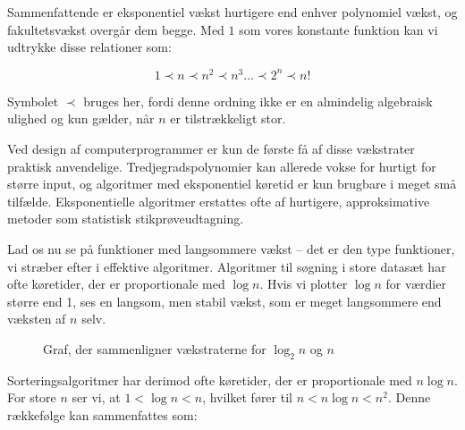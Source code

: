 Sammenfattende er eksponentiel vækst hurtigere end enhver polynomiel vækst, og fakultetsvækst overgår dem begge. Med \(1\) som vores konstante funktion kan vi udtrykke disse relationer som:

\[
1 \prec n \prec n^2 \prec n^3 \ldots \prec 2^n \prec n!
\]

Symbolet \( \prec \) bruges her, fordi denne ordning ikke er en almindelig algebraisk ulighed og kun gælder, når \( n \) er tilstrækkeligt stor.

Ved design af computerprogrammer er kun de første få af disse vækstrater praktisk anvendelige. Tredjegradspolynomier kan allerede vokse for hurtigt for større input, og algoritmer med eksponentiel køretid er kun brugbare i meget små tilfælde. Eksponentielle algoritmer erstattes ofte af hurtigere, approksimative metoder som statistisk stikprøveudtagning.

Lad os nu se på funktioner med langsommere vækst -- det er den type funktioner, vi stræber efter i effektive algoritmer. Algoritmer til søgning i store datasæt har ofte køretider, der er proportionale med \( \log n \). Hvis vi plotter \( \log n \) for værdier større end 1, ses en langsom, men stabil vækst, som er meget langsommere end væksten af \( n \) selv.

\begin{figure}[htbp]
    \centering
    \caption{Graf, der sammenligner vækstraterne for $\log_2 n$ og $n$}
\end{figure}

Sorteringsalgoritmer har derimod ofte køretider, der er proportionale med \( n \log n \). For store \( n \) ser vi, at \( 1 < \log n < n \), hvilket fører til \( n < n \log n < n^2 \). Denne rækkefølge kan sammenfattes som:

